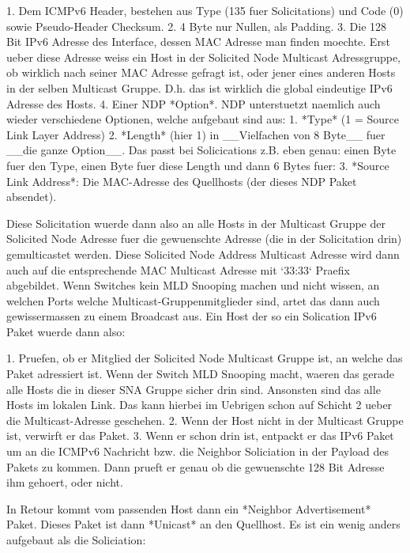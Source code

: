 1. Dem ICMPv6 Header, bestehen aus Type (135 fuer Solicitations) und Code (0)
   sowie Pseudo-Header Checksum.
2. 4 Byte nur Nullen, als Padding.
3. Die 128 Bit IPv6 Adresse des Interface, dessen MAC Adresse man finden
   moechte. Erst ueber diese Adresse weiss ein Host in der Solicited Node
   Multicast Adressgruppe, ob wirklich nach seiner MAC Adresse gefragt ist, oder
   jener eines anderen Hosts in der selben Multicast Gruppe. D.h. das ist
   wirklich die global eindeutige IPv6 Adresse des Hosts.
4. Einer NDP *Option*. NDP unterstuetzt naemlich auch wieder verschiedene
   Optionen, welche aufgebaut sind aus:
   1. *Type* (1 = Source Link Layer Address)
   2. *Length* (hier 1) in \_\_Vielfachen von 8 Byte\_\_ fuer \_\_die
      ganze Option\_\_. Das passt bei Solicications z.B. eben genau: einen Byte
      fuer den Type, einen Byte fuer diese Length und dann 6 Bytes fuer:
  3. *Source Link Address*: Die MAC-Adresse des Quellhosts (der dieses NDP Paket
     absendet).

Diese Solicitation wuerde dann also an alle Hosts in der Multicast Gruppe der
Solicited Node Adresse fuer die gewuenschte Adresse (die in der Solicitation
drin) gemulticastet werden. Diese Solicited Node Address Multicast Adresse wird
dann auch auf die entsprechende MAC Multicast Adresse mit `33:33` Praefix
abgebildet. Wenn Switches kein MLD Snooping machen und nicht wissen, an welchen
Ports welche Multicast-Gruppenmitglieder sind, artet das dann auch
gewissermassen zu einem Broadcast aus. Ein Host der so ein Solication IPv6 Paket
wuerde dann also:

1. Pruefen, ob er Mitglied der Solicited Node Multicast Gruppe ist, an welche
   das Paket adressiert ist. Wenn der Switch MLD Snooping macht, waeren das
   gerade alle Hosts die in dieser SNA Gruppe sicher drin sind. Ansonsten sind
   das alle Hosts im lokalen Link. Das kann hierbei im Uebrigen schon auf
   Schicht 2 ueber die Multicast-Adresse geschehen.
2. Wenn der Host nicht in der Multicast Gruppe ist, verwirft er das Paket.
3. Wenn er schon drin ist, entpackt er das IPv6 Paket um an die ICMPv6 Nachricht
   bzw. die Neighbor Soliciation in der Payload des Pakets zu kommen. Dann
   prueft er genau ob die gewuenschte 128 Bit Adresse ihm gehoert, oder nicht.

In Retour kommt vom passenden Host dann ein *Neighbor Advertisement*
Paket. Dieses Paket ist dann *Unicast* an den Quellhost. Es ist ein wenig anders
aufgebaut als die Soliciation:

